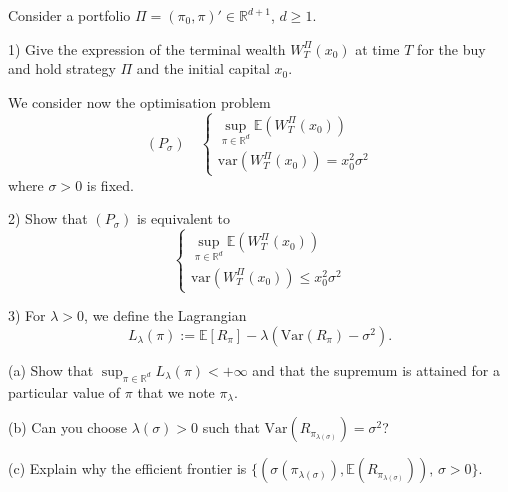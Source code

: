 \begin{exercise}
Consider a portfolio $\Pi = (\pi_0, \pi)' \in \mathbb{R}^{d+1}$, $d \geq 1$.  

1) Give the expression of the terminal wealth $W_T^{\Pi}(x_0)$ at time $T$ for the buy and hold strategy $\Pi$ and the initial capital $x_0$.  

We consider now the optimisation problem
\[
(P_\sigma) \quad 
\begin{cases}
\sup_{\pi \in \mathbb{R}^d} \mathbb{E}(W_T^{\Pi}(x_0)) \\
\mathrm{var}(W_T^{\Pi}(x_0)) = x_0^2\sigma^2
\end{cases}
\]
where $\sigma > 0$ is fixed.  

2) Show that $(P_\sigma)$ is equivalent to
\[
\begin{cases}
\sup_{\pi \in \mathbb{R}^d} \mathbb{E}(W_T^{\Pi}(x_0)) \\
\mathrm{var}(W_T^{\Pi}(x_0)) \leq x_0^2\sigma^2
\end{cases}
\]

3) For $\lambda > 0$, we define the Lagrangian 
\[
L_\lambda(\pi) := \mathbb{E}[R_\pi] - \lambda(\mathrm{Var}(R_\pi) - \sigma^2).
\]

(a) Show that $\sup_{\pi \in \mathbb{R}^d} L_\lambda(\pi) < +\infty$ and that the supremum is attained for a particular value of $\pi$ that we note $\pi_\lambda$.  

(b) Can you choose $\lambda(\sigma) > 0$ such that $\mathrm{Var}(R_{\pi_{\lambda(\sigma)}}) = \sigma^2$?  

(c) Explain why the efficient frontier is $\{(\sigma(\pi_{\lambda(\sigma)}), \mathbb{E}(R_{\pi_{\lambda(\sigma)}})), \, \sigma > 0\}$.
\end{exercise}

